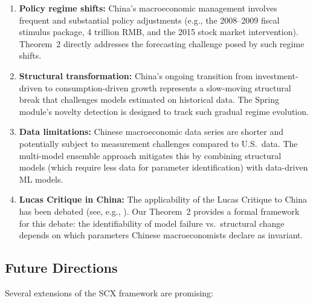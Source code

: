 \documentclass[12pt,a4paper]{article}
\begin{document}
\begin{enumerate}[label=(\arabic*), leftmargin=*]
    \item \textbf{Policy regime shifts:} China's
    macroeconomic management involves frequent and substantial policy
    adjustments (e.g., the 2008--2009 fiscal stimulus package, 4 trillion RMB,
    and the 2015 stock market intervention).  Theorem~2 directly
    addresses the forecasting challenge posed by such regime shifts.

    \item \textbf{Structural transformation:} China's
    ongoing transition from investment-driven to consumption-driven
    growth represents a slow-moving structural break that challenges
    models estimated on historical data.  The Spring module's
    novelty detection is designed to track such gradual regime
    evolution.

    \item \textbf{Data limitations:} Chinese macroeconomic
    data series are shorter and potentially subject to measurement
    challenges compared to U.S.\ data.  The multi-model ensemble
    approach mitigates this by combining structural models (which
    require less data for parameter identification) with data-driven
    ML models.

    \item \textbf{Lucas Critique in China:}
    The applicability of the Lucas Critique to China has been debated
    (see, e.g., \citet{liu2012lucas}).  Our Theorem~2 provides a
    formal framework for this debate: the identifiability of model
    failure vs.\ structural change depends on which parameters
    Chinese macroeconomists declare as invariant.
\end{enumerate}

\subsection{Future Directions}

Several extensions of the SCX framework are promising:
\end{document}
